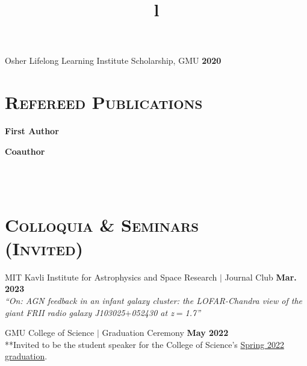 \documentclass[marg, centered]{res}
\begin{document}
\begin{resume}
{Osher Lifelong Learning Institute Scholarship, GMU \hfill \textbf{2020}}
\vspace{-0.0cm}


\section{{\scshape \bfseries Refereed Publications}}

\vspace{-0.1cm}
\textbf{First Author}
\vspace{0.05cm}

\textbf{Coauthor}
\vspace{0.05cm}
\vspace{0.05cm}


\begin{format}
\title{l} \\
 \\
\body
\end{format}

\section{{\scshape \bfseries Colloquia \& Seminars \\(Invited)}}

\begin{etaremune}[itemindent=0pt, leftmargin=19pt]
    
\item MIT Kavli Institute for Astrophysics and Space Research $|$ Journal Club \hfill \textbf{Mar. 2023} \\
\textit{``On: AGN feedback in an infant galaxy cluster: the LOFAR-Chandra view of the giant FRII radio galaxy J103025$+$052430 at z$=$1.7''}

\item GMU College of Science $|$ Graduation Ceremony \hfill \textbf{May 2022} \\
{**Invited to be the student speaker for the College of Science's \href{https://www.youtube.com/watch?v=xsyi9sqYH4o}{\color{dkbu} Spring 2022 graduation}.}


\end{etaremune}
\end{resume}
\end{document}

